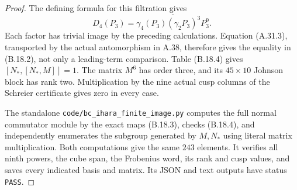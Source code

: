 \begin{proof}
The defining formula for this filtration gives
\[
 D_4(P_3)=
 \overline{\gamma_4(P_3)(\gamma_2P_3)^3P_3^9}.
\]
Each factor has trivial image by the preceding
calculations. Equation (A.31.3), transported by
the actual automorphism in A.38, therefore gives
the equality in (B.18.2), not only a leading-term
comparison. Table (B.18.4) gives
$[N_*,[N_*,M]]=1$. The matrix $M^6$ has order
three, and its $45\times10$ Johnson block has
rank two. Multiplication by the nine actual
cusp columns of the Schreier certificate gives
zero in every case.

The standalone
\texttt{code/bc\_ihara\_finite\_image.py}
computes the full normal commutator module by
the exact maps (B.18.3), checks (B.18.4), and
independently enumerates the subgroup generated
by $M,N_*$ using literal matrix multiplication.
Both computations give the same $243$ elements.
It verifies all ninth powers, the cube span,
the Frobenius word, its rank and cusp values,
and saves every indicated basis and matrix.
Its JSON and text outputs have status
\texttt{PASS}.
\end{proof}


